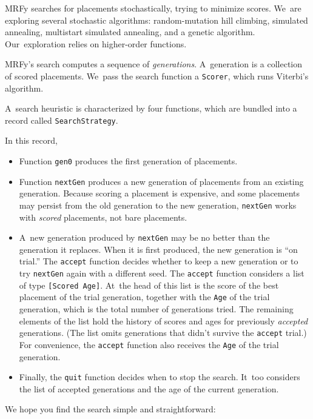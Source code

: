 \documentclass[preprint,nonatbib,blockstyle,nocopyrightspace,times]{sigplanconf}
\newcommand\seclabel[1]{\label{sec:#1}}
\newcommand\smallverbatiminput[1]{{\par\unskip\small}}
\newcommand\smallfuzzverbatiminput[2]{{\par\unskip\small\hfuzz=#1 }}
\begin{document}
MRFy searches for placements stochastically,
trying to minimize scores.
We~are exploring several stochastic algorithms: random-mutation hill
climbing, simulated  
annealing, multistart simulated annealing, and a genetic algorithm.
Our~exploration relies on higher-order functions.

MRFy's search computes a sequence of \emph{generations}.
A~generation is a collection of scored {placements}.
We~pass the
search function a \texttt{Scorer}, which runs Viterbi's algorithm.
\smallverbatiminput{scoredecl}
A~search heuristic is characterized by four functions, which are
bundled into a record called \texttt{SearchStrategy}.
\smallfuzzverbatiminput{2.3pt}{strategy}
In this record,
\begin{itemize}
\item
Function \texttt{gen0} produces the first generation of placements.
\item
Function \texttt{nextGen} produces a new generation of placements from
an existing generation.
Because scoring a placement is expensive, 
and some placements may persist from the old generation to the new
generation, \texttt{nextGen} works with \emph{scored} placements, not
bare placements.
\item
A~new generation produced by \texttt{nextGen} may be no better
than the generation it replaces.
When it is first produced, the new generation is ``on trial.''
The \texttt{accept} function decides whether to keep a new generation
or to try \texttt{nextGen} again with a different seed.
The \texttt{accept} function considers a list of type
\texttt{[Scored~Age]}.
At~the head of this list is the score of the best
placement of the trial generation, together with the \texttt{Age} of the trial
generation, which is the total number of generations tried.
The remaining elements of the list hold the history of scores and ages for
previously \emph{accepted} generations.
(The list omits generations that didn't survive the \texttt{accept} trial.)
For convenience, the \texttt{accept} function also receives
the \texttt{Age} of the trial generation.
\item
Finally, the \texttt{quit} function decides when to stop the search.
It~too considers the list of accepted generations and the age of the current
generation. 
\end{itemize}
\seclabel{search}%
We hope you find the search simple and straightforward:
\smallfuzzverbatiminput{11pt}{search}
\end{document}

